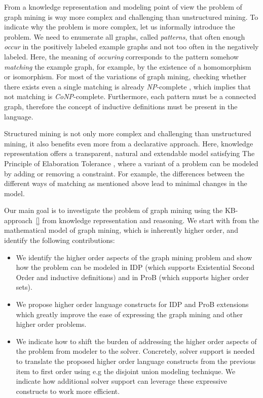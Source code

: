 From a knowledge representation and modeling point of view the problem of graph mining is way more complex and challenging than unstructured mining. 
To indicate why the problem is more complex, let us informally introduce the problem. We need to enumerate all graphs, called \textit{patterns}, that often enough \textit{occur} in the positively labeled example graphs and not too often in the negatively labeled.
Here, the meaning of \textit{occuring} corresponds to the pattern somehow \emph{matching} the example graph, for example, by the existence of a homomorphism or isomorphism.
For most of the variations of graph mining, checking whether there exists even a single matching is already \textit{NP}-complete \citep{subtree_overview}, which implies that not matching is \textit{CoNP}-complete. 
Furthermore, each pattern must be a connected graph, therefore the concept of inductive definitions must be present in the language.

Structured mining is not only more complex and challenging than unstructured mining, it also benefits even more from a declarative approach.
Here, knowledge representation offers a transparent, natural and extendable model satisfying The Principle of Elaboration Tolerance \citep{elaboration_tolerance}, where a variant of a problem can be modeled by adding or removing a constraint.
For example, the differences between the different ways of matching as mentioned above lead to minimal changes in the model.

Our main goal is to investigate the problem of graph mining using the KB-approach~\ref{} from knowledge representation and reasoning. 
We start with from the mathematical model of graph mining, which is inherently higher order, and identify the following contributions:

\begin{itemize}
\item We identify the higher order aspects of the graph mining problem and show how the problem can be modeled in IDP (which supports Existential Second Order and inductive definitions) and in ProB (which supports higher order sets).
\item We propose higher order language constructs for IDP and ProB extensions which greatly improve the ease of expressing the graph mining and other higher order problems.
\item We indicate how to shift the burden of addressing the higher order aspects of the problem from modeler to the solver. 
Concretely, solver support is needed to translate the proposed higher order language constructs from the previous item to first order using e.g the disjoint union modeling technique.
We indicate how additional solver support can leverage these expressive constructs to work more efficient.
\end{itemize}


